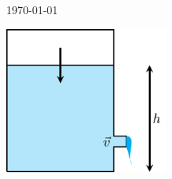 \begin{titlepage}
	
	
	\vfill\vfill\vfill %
	
	{\large\today} %
	

	\vfill\vfill
	\includegraphics[width=0.4\textwidth]{torricelli.pdf}\\[1cm] %
	 
	
	\vfill %
\end{titlepage}
